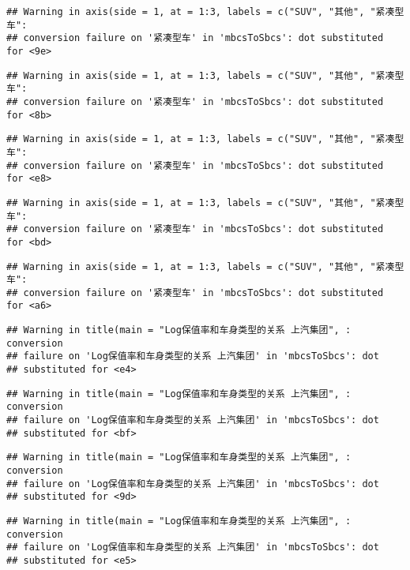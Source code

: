 \documentclass[]{article}
\begin{document}
\begin{verbatim}
## Warning in axis(side = 1, at = 1:3, labels = c("SUV", "其他", "紧凑型车":
## conversion failure on '紧凑型车' in 'mbcsToSbcs': dot substituted for <9e>
\end{verbatim}

\begin{verbatim}
## Warning in axis(side = 1, at = 1:3, labels = c("SUV", "其他", "紧凑型车":
## conversion failure on '紧凑型车' in 'mbcsToSbcs': dot substituted for <8b>
\end{verbatim}

\begin{verbatim}
## Warning in axis(side = 1, at = 1:3, labels = c("SUV", "其他", "紧凑型车":
## conversion failure on '紧凑型车' in 'mbcsToSbcs': dot substituted for <e8>
\end{verbatim}

\begin{verbatim}
## Warning in axis(side = 1, at = 1:3, labels = c("SUV", "其他", "紧凑型车":
## conversion failure on '紧凑型车' in 'mbcsToSbcs': dot substituted for <bd>
\end{verbatim}

\begin{verbatim}
## Warning in axis(side = 1, at = 1:3, labels = c("SUV", "其他", "紧凑型车":
## conversion failure on '紧凑型车' in 'mbcsToSbcs': dot substituted for <a6>
\end{verbatim}

\begin{verbatim}
## Warning in title(main = "Log保值率和车身类型的关系 上汽集团", : conversion
## failure on 'Log保值率和车身类型的关系 上汽集团' in 'mbcsToSbcs': dot
## substituted for <e4>
\end{verbatim}

\begin{verbatim}
## Warning in title(main = "Log保值率和车身类型的关系 上汽集团", : conversion
## failure on 'Log保值率和车身类型的关系 上汽集团' in 'mbcsToSbcs': dot
## substituted for <bf>
\end{verbatim}

\begin{verbatim}
## Warning in title(main = "Log保值率和车身类型的关系 上汽集团", : conversion
## failure on 'Log保值率和车身类型的关系 上汽集团' in 'mbcsToSbcs': dot
## substituted for <9d>
\end{verbatim}

\begin{verbatim}
## Warning in title(main = "Log保值率和车身类型的关系 上汽集团", : conversion
## failure on 'Log保值率和车身类型的关系 上汽集团' in 'mbcsToSbcs': dot
## substituted for <e5>
\end{verbatim}
\end{document}
